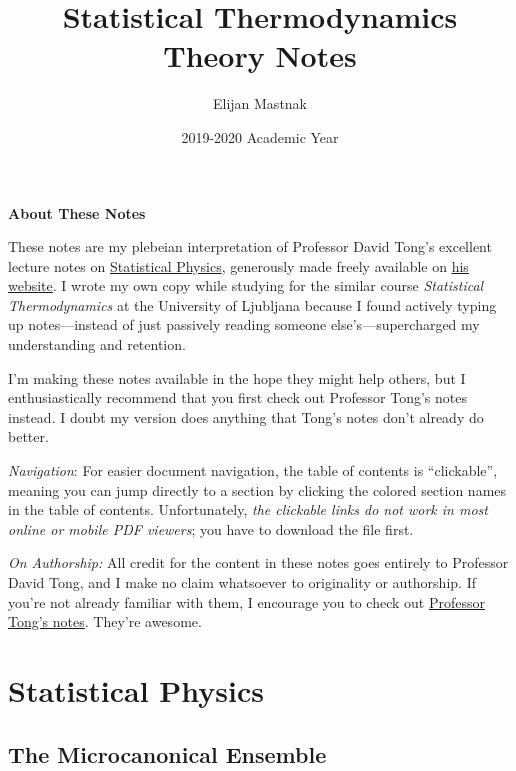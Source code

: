 \documentclass[11pt, a4paper]{article}
\begin{document}
\title{Statistical Thermodynamics Theory Notes}
\author{Elijan Mastnak}
\date{2019-2020 Academic Year}
\maketitle

\begin{center}
\textbf{About These Notes}
\end{center}
These notes are my plebeian interpretation of Professor David Tong's excellent lecture notes on \href{http://www.damtp.cam.ac.uk/user/tong/statphys.html}{Statistical Physics}, generously made freely available on \href{http://www.damtp.cam.ac.uk/user/tong/teaching.html}{\underline{his website}}. I wrote my own copy while studying for the similar course \textit{Statistical Thermodynamics} at the University of Ljubljana because I found actively typing up notes---instead of just passively reading someone else's---supercharged my understanding and retention. 

I'm making these notes available in the hope they might help others, but I enthusiastically recommend that you first check out Professor Tong's notes instead. I doubt my version does anything that Tong's notes don't already do better.

\vspace{2mm}
\textit{Navigation}: For easier document navigation, the table of contents is ``clickable'', meaning you can jump directly to a section by clicking the colored section names in the table of contents. Unfortunately, \textit{the clickable links do not work in most online or mobile PDF viewers}; you have to download the file first.

\vspace{2mm}
\textit{On Authorship:} All credit for the content in these notes goes entirely to Professor David Tong, and I make no claim whatsoever to originality or authorship. If you're not already familiar with them, I encourage you to check out \href{http://www.damtp.cam.ac.uk/user/tong/teaching.html}{Professor Tong's notes}. They're awesome.

\newpage

\tableofcontents

\newpage

\pagestyle{headerstyle}
\section{Statistical Physics}

\subsection{The Microcanonical Ensemble}
\end{document}
